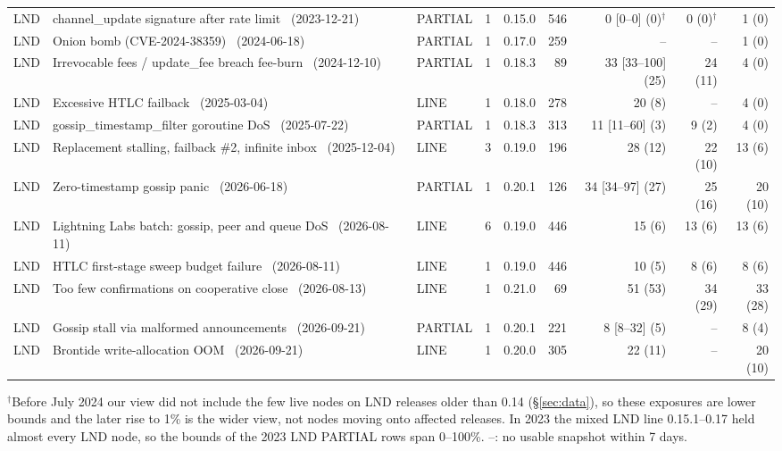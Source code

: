 \begin{table}[t]
{\begin{tabular}{lllrlrrrr}
LND & channel\_update signature after rate limit~\cite{delving2023lndgossip} (2023-12-21) & PARTIAL & 1 & 0.15.0 & 546 & 0 [0--0] (0)$^\dagger$ & 0 (0)$^\dagger$ & 1 (0) \\
LND & Onion bomb (CVE-2024-38359)~\cite{morehouse2024onionbomb} (2024-06-18) & PARTIAL & 1 & 0.17.0 & 259 & -- & -- & 1 (0) \\
LND & Irrevocable fees / update\_fee breach fee-burn~\cite{harding2024irrevocable} (2024-12-10) & PARTIAL & 1 & 0.18.3 & 89 & 33 [33--100] (25) & 24 (11) & 4 (0) \\
LND & Excessive HTLC failback~\cite{morehouse2025failback} (2025-03-04) & LINE & 1 & 0.18.0 & 278 & 20 (8) & -- & 4 (0) \\
LND & gossip\_timestamp\_filter goroutine DoS~\cite{morehouse2025gtsfilter} (2025-07-22) & PARTIAL & 1 & 0.18.3 & 313 & 11 [11--60] (3) & 9 (2) & 4 (0) \\
LND & Replacement stalling, failback \#2, infinite inbox~\cite{morehouse2025stalling,morehouse2025failback2,morehouse2025inbox} (2025-12-04) & LINE & 3 & 0.19.0 & 196 & 28 (12) & 22 (10) & 13 (6) \\
LND & Zero-timestamp gossip panic~\cite{lightninglabs2026zerots} (2026-06-18) & PARTIAL & 1 & 0.20.1 & 126 & 34 [34--97] (27) & 25 (16) & 20 (10) \\
LND & Lightning Labs batch: gossip, peer and queue DoS~\cite{lightninglabs2026aug} (2026-08-11) & LINE & 6 & 0.19.0 & 446 & 15 (6) & 13 (6) & 13 (6) \\
LND & HTLC first-stage sweep budget failure~\cite{lightninglabs2026sweepbudget} (2026-08-11) & LINE & 1 & 0.19.0 & 446 & 10 (5) & 8 (6) & 8 (6) \\
LND & Too few confirmations on cooperative close~\cite{teinturier2026closeconf} (2026-08-13) & LINE & 1 & 0.21.0 & 69 & 51 (53) & 34 (29) & 33 (28) \\
LND & Gossip stall via malformed announcements~\cite{lightninglabs2026gossipstall} (2026-09-21) & PARTIAL & 1 & 0.20.1 & 221 & 8 [8--32] (5) & -- & 8 (4) \\
LND & Brontide write-allocation OOM~\cite{lightninglabs2026brontide} (2026-09-21) & LINE & 1 & 0.20.0 & 305 & 22 (11) & -- & 20 (10) \\
\bottomrule
\end{tabular}}
\par\vspace{2pt}\parbox{\textwidth}{\footnotesize $^\dagger$Before July 2024 our view did not include the few live nodes on LND releases older than 0.14 (\S\ref{sec:data}), so these exposures are lower bounds and the later rise to 1\% is the wider view, not nodes moving onto affected releases. In 2023 the mixed LND line 0.15.1--0.17 held almost every LND node, so the bounds of the 2023 LND PARTIAL rows span 0--100\%. --: no usable snapshot within 7 days.}
\end{table}
